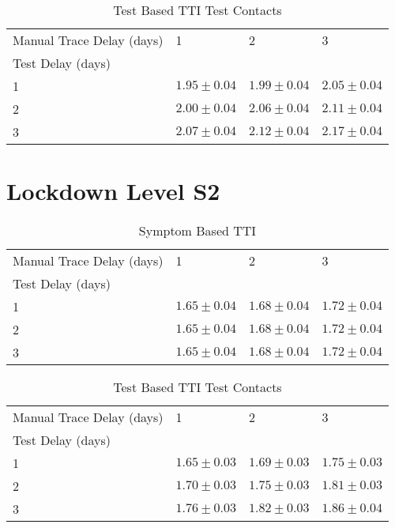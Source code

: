 \documentclass{article}
\begin{document}
    \begin{table}[H]
         \begin{tabular}{llll}
\toprule
Manual Trace Delay (days) &                1 &                2 &                3 \\
Test Delay (days) &                  &                  &                  \\
\midrule
1                 &  $1.95 \pm 0.04$ &  $1.99 \pm 0.04$ &  $2.05 \pm 0.04$ \\
2                 &  $2.00 \pm 0.04$ &  $2.06 \pm 0.04$ &  $2.11 \pm 0.04$ \\
3                 &  $2.07 \pm 0.04$ &  $2.12 \pm 0.04$ &  $2.17 \pm 0.04$ \\
\bottomrule
\end{tabular}

        \caption{Test Based TTI Test Contacts}
    \end{table}
    

\clearpage

\section{Lockdown Level S2}


    \begin{table}[H]
         \begin{tabular}{llll}
\toprule
Manual Trace Delay (days) &                1 &                2 &                3 \\
Test Delay (days) &                  &                  &                  \\
\midrule
1                 &  $1.65 \pm 0.04$ &  $1.68 \pm 0.04$ &  $1.72 \pm 0.04$ \\
2                 &  $1.65 \pm 0.04$ &  $1.68 \pm 0.04$ &  $1.72 \pm 0.04$ \\
3                 &  $1.65 \pm 0.04$ &  $1.68 \pm 0.04$ &  $1.72 \pm 0.04$ \\
\bottomrule
\end{tabular}

        \caption{Symptom Based TTI}
    \end{table}
    


    \begin{table}[H]
         \begin{tabular}{llll}
\toprule
Manual Trace Delay (days) &                1 &                2 &                3 \\
Test Delay (days) &                  &                  &                  \\
\midrule
1                 &  $1.65 \pm 0.03$ &  $1.69 \pm 0.03$ &  $1.75 \pm 0.03$ \\
2                 &  $1.70 \pm 0.03$ &  $1.75 \pm 0.03$ &  $1.81 \pm 0.03$ \\
3                 &  $1.76 \pm 0.03$ &  $1.82 \pm 0.03$ &  $1.86 \pm 0.04$ \\
\bottomrule
\end{tabular}

        \caption{Test Based TTI Test Contacts}
    \end{table}
    
\end{document}
